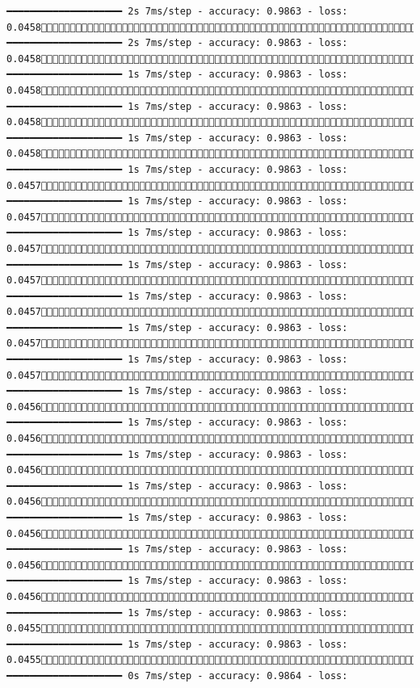 \documentclass[
  letterpaper,
  DIV=11,
  numbers=noendperiod]{scrreprt}
\begin{document}
\begin{verbatim}
━━━━━━━━━━━━━━━━━━━━ 2s 7ms/step - accuracy: 0.9863 - loss: 0.04581599/1875 ━━━━━━━━━━━━━━━━━━━━ 2s 7ms/step - accuracy: 0.9863 - loss: 0.04581607/1875 ━━━━━━━━━━━━━━━━━━━━ 1s 7ms/step - accuracy: 0.9863 - loss: 0.04581615/1875 ━━━━━━━━━━━━━━━━━━━━ 1s 7ms/step - accuracy: 0.9863 - loss: 0.04581622/1875 ━━━━━━━━━━━━━━━━━━━━ 1s 7ms/step - accuracy: 0.9863 - loss: 0.04581629/1875 ━━━━━━━━━━━━━━━━━━━━ 1s 7ms/step - accuracy: 0.9863 - loss: 0.04571636/1875 ━━━━━━━━━━━━━━━━━━━━ 1s 7ms/step - accuracy: 0.9863 - loss: 0.04571644/1875 ━━━━━━━━━━━━━━━━━━━━ 1s 7ms/step - accuracy: 0.9863 - loss: 0.04571652/1875 ━━━━━━━━━━━━━━━━━━━━ 1s 7ms/step - accuracy: 0.9863 - loss: 0.04571660/1875 ━━━━━━━━━━━━━━━━━━━━ 1s 7ms/step - accuracy: 0.9863 - loss: 0.04571667/1875 ━━━━━━━━━━━━━━━━━━━━ 1s 7ms/step - accuracy: 0.9863 - loss: 0.04571674/1875 ━━━━━━━━━━━━━━━━━━━━ 1s 7ms/step - accuracy: 0.9863 - loss: 0.04571682/1875 ━━━━━━━━━━━━━━━━━━━━ 1s 7ms/step - accuracy: 0.9863 - loss: 0.04561690/1875 ━━━━━━━━━━━━━━━━━━━━ 1s 7ms/step - accuracy: 0.9863 - loss: 0.04561698/1875 ━━━━━━━━━━━━━━━━━━━━ 1s 7ms/step - accuracy: 0.9863 - loss: 0.04561705/1875 ━━━━━━━━━━━━━━━━━━━━ 1s 7ms/step - accuracy: 0.9863 - loss: 0.04561711/1875 ━━━━━━━━━━━━━━━━━━━━ 1s 7ms/step - accuracy: 0.9863 - loss: 0.04561717/1875 ━━━━━━━━━━━━━━━━━━━━ 1s 7ms/step - accuracy: 0.9863 - loss: 0.04561723/1875 ━━━━━━━━━━━━━━━━━━━━ 1s 7ms/step - accuracy: 0.9863 - loss: 0.04561730/1875 ━━━━━━━━━━━━━━━━━━━━ 1s 7ms/step - accuracy: 0.9863 - loss: 0.04551737/1875 ━━━━━━━━━━━━━━━━━━━━ 1s 7ms/step - accuracy: 0.9863 - loss: 0.04551745/1875 ━━━━━━━━━━━━━━━━━━━━ 0s 7ms/step - accuracy: 0.9864 - loss: 
\end{verbatim}
\end{document}
